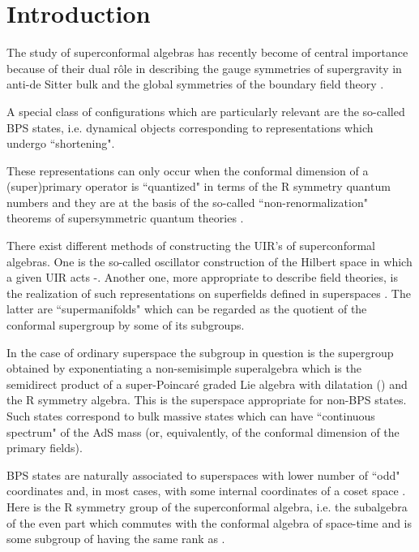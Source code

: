 \documentclass[a4paper,12pt]{article}
\begin{document}
\section{Introduction}

The study of superconformal algebras has recently become of 
central importance because of their dual r\^ole in describing the 
gauge symmetries of supergravity in anti-de Sitter bulk and the 
global symmetries of the boundary field theory \cite{mal,gkp,wit}. 

A special class of configurations which are particularly relevant 
are the so-called BPS states, i.e. dynamical objects corresponding 
to representations which undergo ``shortening". 

These representations can only occur when the conformal dimension 
of a (super)primary operator is ``quantized" in terms of the R 
symmetry quantum numbers and they are at the basis of the 
so-called ``non-renormalization" theorems of supersymmetric 
quantum theories \cite{FIZ}. 

There exist different methods of constructing the UIR's of 
superconformal algebras. One is the so-called oscillator 
construction of the Hilbert space in which a given UIR acts 
\cite{bgg}-\cite{gmz2}. Another one, more appropriate to describe 
field theories, is the realization of such representations on 
superfields defined in superspaces \cite{SS,fwz}. The latter are 
``supermanifolds" which can be regarded as the quotient of the 
conformal supergroup by some of its subgroups. 

In the case of ordinary superspace the subgroup in question is the 
supergroup obtained by exponentiating a non-semisimple 
superalgebra which is the semidirect product of a super-Poincar\'{e} 
graded Lie algebra with dilatation (\coordHE{}) and the R 
symmetry algebra. This is the superspace appropriate for non-BPS 
states. Such states correspond to bulk massive states which can 
have ``continuous spectrum" of the AdS mass (or, equivalently, of 
the conformal dimension of the primary fields). 

BPS states are naturally associated to superspaces with lower 
number of ``odd" coordinates and, in most cases, with some 
internal coordinates of a coset space \coordHE{}. Here \coordHE{} is the R 
symmetry group of the superconformal algebra, i.e. the subalgebra 
of the even part which commutes with the conformal algebra of 
space-time and \coordHE{} is some subgroup of \coordHE{} having the same rank as 
\coordHE{}.  
\end{document}
